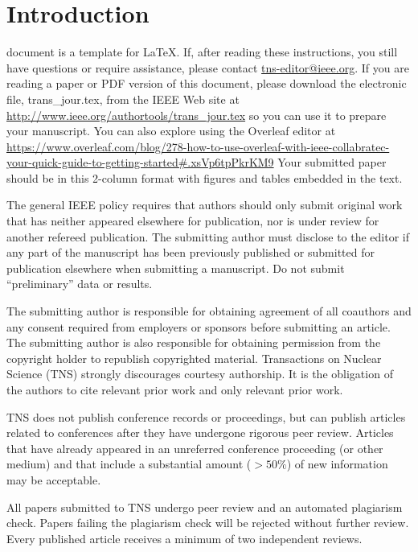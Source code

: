 \documentclass{IEEEtran}
\begin{document}
\section{Introduction}
\label{sec:introduction}
 document is a template for \LaTeX. If, after reading these
instructions, you still have questions or require assistance, please contact
\underline {tns-editor@ieee.org}. If you are
reading a paper or PDF version of this document, please download the
electronic file, trans\_jour.tex, from the IEEE Web site at \underline
{http://www.ieee.org/authortools/trans\_jour.tex} so you can use it
to prepare your manuscript. You can also explore using the Overleaf editor at
\underline{https://www.overleaf.com/blog/278-how-to-use-overleaf-with-}\discretionary{}{}{}\underline
{ieee-collabratec-your-quick-guide-to-getting-started\#.}\discretionary{}{}{}\underline{xsVp6tpPkrKM9}
Your submitted paper should be
in this 2-column format with figures and tables embedded in the text.

The general IEEE policy requires that authors should only submit original
work that has neither appeared elsewhere for publication, nor is under
review for another refereed publication. The submitting author must disclose
to the editor if any part of the manuscript has been previously published or
submitted for publication elsewhere when submitting a manuscript. Do not
submit ``preliminary'' data or results.

The submitting author is responsible for obtaining agreement of all
coauthors and any consent required from employers or sponsors before
submitting an article. The submitting author is also responsible for
obtaining permission from the copyright holder to republish copyrighted
material. Transactions on Nuclear Science (TNS) strongly discourages
courtesy authorship. It is the obligation of the authors to cite relevant
prior work and only relevant prior work.

TNS does not publish conference records or proceedings, but can publish
articles related to conferences after they have undergone rigorous peer
review. Articles that have already appeared in an unreferred conference
proceeding (or other medium) and that include a substantial amount
($>50\%$) of new information may be acceptable.

All papers submitted to TNS undergo peer review and an automated plagiarism
check. Papers failing the plagiarism check will be rejected without further
review. Every published article receives a minimum of two independent
reviews.
\end{document}
